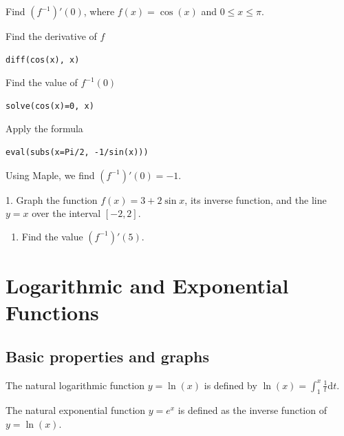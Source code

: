 \documentclass[]{book}
\providecommand{\tightlist}{%
  \setlength{\itemsep}{0pt}\setlength{\parskip}{0pt}}
\theoremstyle{definition}
\theoremstyle{definition}
\theoremstyle{definition}
\theoremstyle{remark}
\let\BeginKnitrBlock\begin \let\EndKnitrBlock\end
\begin{document}
\BeginKnitrBlock{example}
\protect\hypertarget{exm:unnamed-chunk-3}{}{\label{exm:unnamed-chunk-3} }Find \((f^{-1})'(0)\), where \(f(x)=\cos(x)\) and \(0\leq x\leq \pi\).
\EndKnitrBlock{example}

\BeginKnitrBlock{solution}
{}
Find the derivative of \(f\)

\begin{verbatim}
diff(cos(x), x)
\end{verbatim}

Find the value of \(f^{-1}(0)\)

\begin{verbatim}
solve(cos(x)=0, x)
\end{verbatim}

Apply the formula

\begin{verbatim}
eval(subs(x=Pi/2, -1/sin(x)))
\end{verbatim}

Using Maple, we find \((f^{-1})'(0)=-1\).
\EndKnitrBlock{solution}

\BeginKnitrBlock{exercise}
\protect\hypertarget{exr:unnamed-chunk-5}{}{\label{exr:unnamed-chunk-5} }
1. Graph the function \(f(x)=3+2\sin x\), its inverse function, and the line \(y=x\) over the interval \([-2,2]\).

\begin{enumerate}
\def\labelenumi{\arabic{enumi}.}
\setcounter{enumi}{1}
\tightlist
\item
  Find the value \((f^{-1})'(5)\).
\end{enumerate}
\EndKnitrBlock{exercise}

\hypertarget{logarithmic-and-exponential-functions}{%
\chapter{Logarithmic and Exponential Functions}\label{logarithmic-and-exponential-functions}}

\hypertarget{basic-properties-and-graphs}{%
\section{Basic properties and graphs}\label{basic-properties-and-graphs}}

The natural logarithmic function \(y=\ln(x)\) is defined by \(\ln(x)=\int_1^x\frac{1}{t}\mathrm{d} t\).

The natural exponential function \(y=e^x\) is defined as the inverse function of \(y=\ln(x)\).
\end{document}
